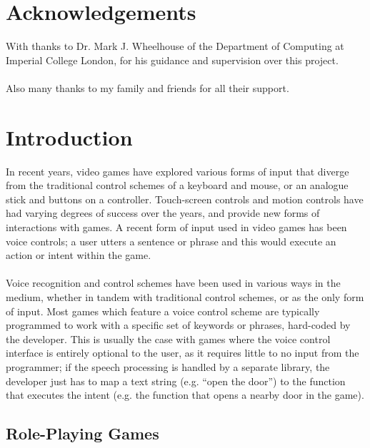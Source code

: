 \documentclass[11pt]{article}
\begin{document}
\newpage

\section{Acknowledgements}

With thanks to Dr. Mark J. Wheelhouse of the Department of Computing at Imperial College London, for his guidance and supervision over this project.
\\
\\
Also many thanks to my family and friends for all their support.

\newpage

\section{Introduction}
In recent years, video games have explored various forms of input that diverge from the traditional control schemes of a keyboard and mouse, or an analogue stick and buttons on a controller. Touch-screen controls and motion controls have had varying degrees of success over the years, and provide new forms of interactions with games. A recent form of input used in video games has been voice controls; a user utters a sentence or phrase and this would execute an action or intent within the game.
\\
\\
Voice recognition and control schemes have been used in various ways in the medium, whether in tandem with traditional control schemes, or as the only form of input. Most games which feature a voice control scheme are typically programmed to work with a specific set of keywords or phrases, hard-coded by the developer. This is usually the case with games where the voice control interface is entirely optional to the user, as it requires little to no input from the programmer; if the speech processing is handled by a separate library, the developer just has to map a text string (e.g. ``open the door'') to the function that executes the intent (e.g. the function that opens a nearby door in the game).

\subsection{Role-Playing Games}
\end{document}
